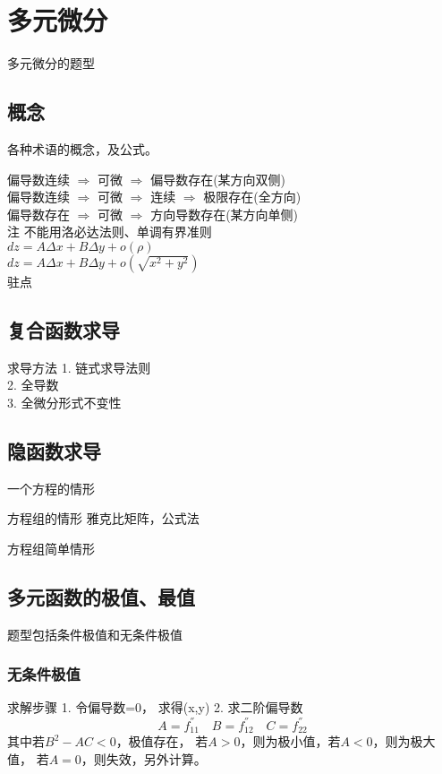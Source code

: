 \chapter{多元微分}


多元微分的题型

\section{概念}
各种术语的概念，及公式。

\noindent
偏导数连续 $\Longrightarrow$ 可微 $\Longrightarrow$ 偏导数存在(某方向双侧) \\
偏导数连续 $\Longrightarrow$ 可微 $\Longrightarrow$ 连续 $\Longrightarrow$ 极限存在(全方向) \\
偏导数存在 $\Longrightarrow$ 可微 $\Longrightarrow$ 方向导数存在(某方向单侧) \\

注
不能用洛必达法则、单调有界准则 \\
$dz = A\Delta x + B\Delta y + o(\rho)$ \\
$dz = A\Delta x + B\Delta y + o(\sqrt{x^2+y^2})$ \\


驻点

\section{复合函数求导}
求导方法
1. 链式求导法则 \\ 
2. 全导数 \\
3. 全微分形式不变性 \\



\section{隐函数求导}
一个方程的情形

方程组的情形
雅克比矩阵，公式法 

方程组简单情形



\section{多元函数的极值、最值}
题型包括条件极值和无条件极值

\subsection{无条件极值}
求解步骤
1. 令偏导数=0， 求得(x,y)
2. 求二阶偏导数
$$
A = f_{11}^{''} \quad{}  B = f_{12}^{''} \quad{} C = f_{22}^{''}
$$
其中若$B^2 - AC < 0$，极值存在，
若$A > 0$，则为极小值，若$A < 0$，则为极大值，
若$A = 0$，则失效，另外计算。


